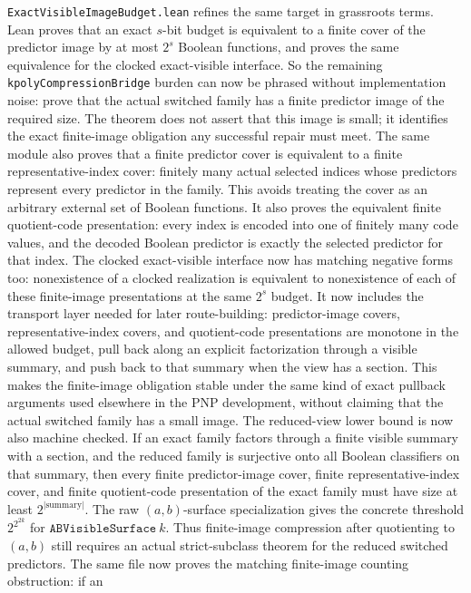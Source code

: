 \documentclass[11pt]{article}
\theoremstyle{remark}
\begin{document}
\texttt{ExactVisibleImageBudget.lean} refines the same target in grassroots
terms.  Lean proves that an exact \(s\)-bit budget is equivalent to a finite
cover of the predictor image by at most \(2^s\) Boolean functions, and proves
the same equivalence for the clocked exact-visible interface.  So the remaining
\texttt{kpolyCompressionBridge} burden can now be phrased without implementation
noise: prove that the actual switched family has a finite predictor image of
the required size.  The theorem does not assert that this image is small; it
identifies the exact finite-image obligation any successful repair must meet.
The same module also proves that a finite predictor cover is equivalent to a
finite representative-index cover: finitely many actual selected indices whose
predictors represent every predictor in the family.  This avoids treating the
cover as an arbitrary external set of Boolean functions.
It also proves the equivalent finite quotient-code presentation: every index is
encoded into one of finitely many code values, and the decoded Boolean predictor
is exactly the selected predictor for that index.  The clocked exact-visible
interface now has matching negative forms too: nonexistence of a clocked
realization is equivalent to nonexistence of each of these finite-image
presentations at the same \(2^s\) budget.
It now includes the transport layer needed for later route-building:
predictor-image covers, representative-index covers, and quotient-code
presentations are monotone in the allowed budget, pull back along an explicit
factorization through a visible summary, and push back to that summary when the
view has a section.  This makes the finite-image obligation stable under the
same kind of exact pullback arguments used elsewhere in the PNP development,
without claiming that the actual switched family has a small image.
The reduced-view lower bound is now also machine checked.  If an exact family
factors through a finite visible summary with a section, and the reduced family
is surjective onto all Boolean classifiers on that summary, then every finite
predictor-image cover, finite representative-index cover, and finite
quotient-code presentation of the exact family must have size at least
\(2^{|\mathrm{summary}|}\).  The raw \((a,b)\)-surface specialization gives
the concrete threshold \(2^{2^{2k}}\) for \(\texttt{ABVisibleSurface}\ k\).
Thus finite-image compression after quotienting to \((a,b)\) still requires an
actual strict-subclass theorem for the reduced switched predictors.
The same file now proves the matching finite-image counting obstruction: if an
\end{document}
